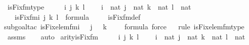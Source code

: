 \begin{isabellebody}
\isanewline
{}\isamarkupfalse%
\ is{\isacharunderscore}{\kern0pt}Fix{\isacharunderscore}{\kern0pt}fm{\isacharunderscore}{\kern0pt}type\ {\isacharcolon}{\kern0pt}\ \isanewline
\ \ \ i\ j\ k\ l\ \isanewline
\ \ \ {\isachardoublequoteopen}i\ {\isasymin}\ nat{\isachardoublequoteclose}\ {\isachardoublequoteopen}j\ {\isasymin}\ nat{\isachardoublequoteclose}\ {\isachardoublequoteopen}k\ {\isasymin}\ nat{\isachardoublequoteclose}\ {\isachardoublequoteopen}l\ {\isasymin}\ nat{\isachardoublequoteclose}\isanewline
\ \ \ {\isachardoublequoteopen}is{\isacharunderscore}{\kern0pt}Fix{\isacharunderscore}{\kern0pt}fm{\isacharparenleft}{\kern0pt}i{\isacharcomma}{\kern0pt}\ j{\isacharcomma}{\kern0pt}\ k{\isacharcomma}{\kern0pt}\ l{\isacharparenright}{\kern0pt}\ {\isasymin}\ formula{\isachardoublequoteclose}\ \isanewline
%
\isadelimproof
\isanewline
\ \ %
\endisadelimproof
%
\isatagproof
{}\isamarkupfalse%
\ is{\isacharunderscore}{\kern0pt}Fix{\isacharunderscore}{\kern0pt}fm{\isacharunderscore}{\kern0pt}def\isanewline
\ \ \isamarkupfalse%
{\isacharparenleft}{\kern0pt}subgoal{\isacharunderscore}{\kern0pt}tac\ {\isachardoublequoteopen}is{\isacharunderscore}{\kern0pt}Fix{\isacharunderscore}{\kern0pt}elem{\isacharunderscore}{\kern0pt}fm{\isacharparenleft}{\kern0pt}i\ {\isacharhash}{\kern0pt}{\isacharplus}{\kern0pt}\ {}{\isacharcomma}{\kern0pt}\ j\ {\isacharhash}{\kern0pt}{\isacharplus}{\kern0pt}\ {}{\isacharcomma}{\kern0pt}\ k\ {\isacharhash}{\kern0pt}{\isacharplus}{\kern0pt}\ {}{\isacharcomma}{\kern0pt}\ {}{\isacharparenright}{\kern0pt}\ {\isasymin}\ formula{\isachardoublequoteclose}{\isacharcomma}{\kern0pt}\ force{\isacharparenright}{\kern0pt}\isanewline
\ \ \isamarkupfalse%
{\isacharparenleft}{\kern0pt}rule\ is{\isacharunderscore}{\kern0pt}Fix{\isacharunderscore}{\kern0pt}elem{\isacharunderscore}{\kern0pt}fm{\isacharunderscore}{\kern0pt}type{\isacharparenright}{\kern0pt}\isanewline
\ \ \isamarkupfalse%
\ assms\isanewline
\ \ \isamarkupfalse%
\ auto%
\endisatagproof
{\isafoldproof}%
%
\isadelimproof
\isanewline
%
\endisadelimproof
\isanewline
{}\isamarkupfalse%
\ arity{\isacharunderscore}{\kern0pt}is{\isacharunderscore}{\kern0pt}Fix{\isacharunderscore}{\kern0pt}fm\ {\isacharcolon}{\kern0pt}\ \isanewline
\ \ \ i\ j\ k\ l\ \isanewline
\ \ \ {\isachardoublequoteopen}i\ {\isasymin}\ nat{\isachardoublequoteclose}\ {\isachardoublequoteopen}j\ {\isasymin}\ nat{\isachardoublequoteclose}\ {\isachardoublequoteopen}k\ {\isasymin}\ nat{\isachardoublequoteclose}\ {\isachardoublequoteopen}l\ {\isasymin}\ nat{\isachardoublequoteclose}\isanewline

\end{isabellebody}

